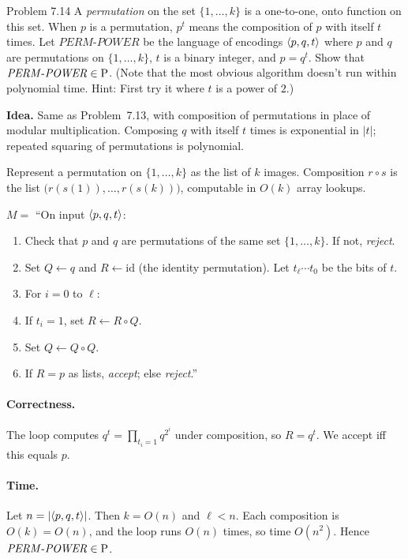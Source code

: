 \begin{question}{Problem 7.14}
A \emph{permutation} on the set $\{1,\dots,k\}$ is a one-to-one, onto function on this set. When $p$ is a permutation, $p^t$ means the composition of $p$ with itself $t$ times. Let $\mathit{PERM\text{-}POWER}$ be the language of encodings $\langle p,q,t\rangle$ where $p$ and $q$ are permutations on $\{1,\dots,k\}$, $t$ is a binary integer, and $p=q^t$.
Show that $\mathit{PERM\text{-}POWER}\in\mathrm{P}$. (Note that the most obvious algorithm doesn't run within polynomial time. Hint: First try it where $t$ is a power of $2$.)
\end{question}
\begin{soln}
\textbf{Idea.} Same as Problem~7.13, with composition of permutations in place of modular multiplication. Composing $q$ with itself $t$ times is exponential in $|t|$; repeated squaring of permutations is polynomial.

Represent a permutation on $\{1,\dots,k\}$ as the list of $k$ images. Composition $r\circ s$ is the list $\bigl(r(s(1)),\dots,r(s(k))\bigr)$, computable in $O(k)$ array lookups.

$M=$ ``On input $\langle p,q,t\rangle$:
\begin{enumerate}
\item Check that $p$ and $q$ are permutations of the same set $\{1,\dots,k\}$. If not, \emph{reject}.
\item Set $Q\leftarrow q$ and $R\leftarrow\mathrm{id}$ (the identity permutation). Let $t_\ell\cdots t_0$ be the bits of $t$.
\item For $i=0$ to $\ell$:
\item \quad If $t_i=1$, set $R\leftarrow R\circ Q$.
\item \quad Set $Q\leftarrow Q\circ Q$.
\item If $R=p$ as lists, \emph{accept}; else \emph{reject}.''
\end{enumerate}

\paragraph{Correctness.}
The loop computes $q^t=\prod_{t_i=1}q^{2^i}$ under composition, so $R=q^t$. We accept iff this equals $p$.

\paragraph{Time.}
Let $n=|\langle p,q,t\rangle|$. Then $k=O(n)$ and $\ell<n$. Each composition is $O(k)=O(n)$, and the loop runs $O(n)$ times, so time $O(n^2)$. Hence $\mathit{PERM\text{-}POWER}\in\mathrm{P}$.
\end{soln}

